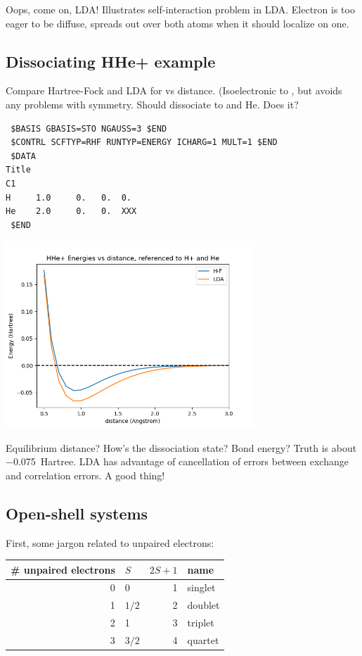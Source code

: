 \documentclass[11pt]{article}
\begin{document}
Oops, come on, LDA!  Illustrates self-interaction problem in LDA.  Electron is too eager to be diffuse, spreads out over both atoms when it should localize on one.

\subsection{Dissociating HHe+ example}
\label{sec:org3dcf116}
Compare Hartree-Fock and LDA for  vs distance. (Isoelectronic to , but avoids any problems with symmetry. Should dissociate to  and He.  Does it?

\begin{verbatim}
 $BASIS GBASIS=STO NGAUSS=3 $END
 $CONTRL SCFTYP=RHF RUNTYP=ENERGY ICHARG=1 MULT=1 $END
 $DATA 
Title
C1
H     1.0     0.   0.  0.
He    2.0     0.   0.  XXX
 $END
\end{verbatim}

\begin{center}
\includegraphics[width=0.7\textwidth]{./Images/HHe+.png}
\end{center}

Equilibrium distance? How's the dissociation state?  Bond energy?  Truth is about \SI{-0.075}{Hartree}. LDA has advantage of cancellation of errors between exchange and correlation errors.  A good thing!
\subsection{Open-shell systems}
\label{sec:org4aac7b7}
First, some jargon related to unpaired electrons:
\begin{center}
\begin{tabular}{rlrl}
\# unpaired electrons & \(S\) & \(2S+1\) & name\\
\hline
0 & 0 & 1 & singlet\\
1 & \(1/2\) & 2 & doublet\\
2 & 1 & 3 & triplet\\
3 & \(3/2\) & 4 & quartet\\
\end{tabular}
\end{center}
\end{document}
